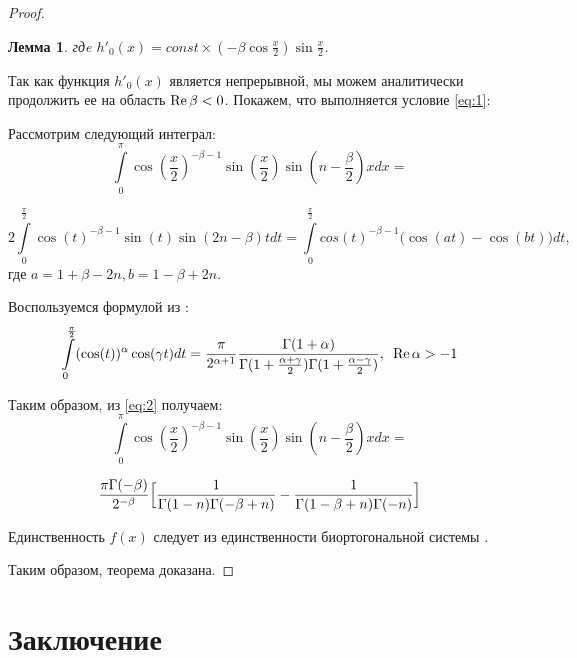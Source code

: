﻿\documentclass[oneside, final, 14pt]{extreport}
\newtheorem{lemma}{Лемма}
\begin{document}
\begin{proof}
\begin{lemma}
			гдe $h'_0(x) = const \times (-\beta\cos\frac{x}{2})\sin\frac{x}{2}$.
		\end{lemma}
		
		Так как функция $h'_0(x)$ является непрерывной, мы можем аналитически продолжить ее на область 
		$\operatorname{Re}\beta < 0$. Покажем, что выполняется условие \eqref{eq:1}:
		
		 Рассмотрим следующий интеграл:
		$$
			\int\limits_0^\pi\cos(\frac{x}{2})^{-\beta - 1}\sin(\frac{x}{2})\sin(n - \frac{\beta}{2})xdx = 
		$$
		
		\begin{equation}
			2\int\limits_0^\frac{\pi}{2}\cos(t)^{-\beta - 1}\sin(t)\sin(2n - \beta)tdt 
			= \int\limits_0^\frac{\pi}{2}cos(t)^{-\beta-1}\bigl(\cos(at) - \cos(bt)\bigr)dt,	\tag{2} \label{eq:2}
		\end{equation}
		где $a =1 + \beta - 2n, b = 1 - \beta + 2n.$
		
		
		
		\bigskip
		
		Воспользуемся формулой из \cite{bateman}:
		$$
			\int\limits_0^\frac{\pi}{2}(\cos(t))^\alpha \cos(\gamma t)dt = \frac{\pi}{2^{\alpha + 1}}
			\frac{\Gamma(1 + \alpha)}{\Gamma(1 + \frac{\alpha + \gamma}{2})\Gamma(1 + \frac{\alpha - \gamma}{2})},
			\enspace\operatorname{Re}\alpha > -1
		$$
		
		Таким образом, из \eqref{eq:2} получаем:
		$$
			\int\limits_0^\pi\cos(\frac{x}{2})^{-\beta - 1}\sin(\frac{x}{2})\sin(n - \frac{\beta}{2})xdx = 
		$$
		
		$$
			\frac{\pi\Gamma(-\beta)}{2^{-\beta}}\Bigl[\frac{1}{\Gamma(1 - n)\Gamma(-\beta + n)} - 
			\frac{1}{\Gamma(1 -\beta + n)\Gamma(- n)}\Bigr]
		$$
		
		Единственность $f(x)$ следует из единственности биортогональной системы \cite{moi:dan}.
		
		Таким образом, теорема доказана.
		
	\end{proof}




	
\chapter*{Заключение}
	
\end{document}
